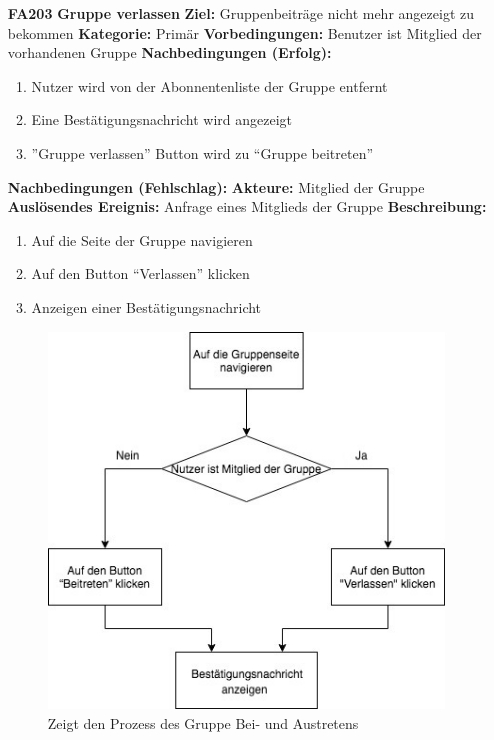 \documentclass[parskip=full]{scrartcl}
\begin{document}
\begin{itemize}[nosep]
			\item[\textbf{FA203}]\textbf{Gruppe verlassen}
			\newline \textbf{Ziel:} Gruppenbeiträge nicht mehr angezeigt zu bekommen
			\newline \textbf{Kategorie:} Primär
			\newline \textbf{Vorbedingungen:} Benutzer ist Mitglied der vorhandenen Gruppe
			\newline \textbf{Nachbedingungen (Erfolg):} 
			\begin{enumerate}[nosep]
				\item Nutzer wird von der \gls{Abonnenten}liste der Gruppe entfernt
				\item Eine Bestätigungsnachricht wird angezeigt
				\item ”Gruppe verlassen” \gls{Button} wird zu “Gruppe beitreten” 
			\end{enumerate}
			\textbf{Nachbedingungen (Fehlschlag):}
			\newline \textbf{Akteure:} Mitglied der Gruppe
			\newline \textbf{Auslösendes Ereignis:} Anfrage eines Mitglieds der Gruppe
			\newline \textbf{Beschreibung:}
			\begin{enumerate}[nosep]
				\item Auf die Seite der Gruppe navigieren
				\item Auf den \gls{Button} “Verlassen” klicken
				\item Anzeigen einer Bestätigungsnachricht\\
			\end{enumerate}
			
					\begin{figure}[H]
						\centering
						\includegraphics[height=10cm]{Gruppendiagramm}
						\caption{Zeigt den Prozess des Gruppe Bei- und Austretens}
						\label{Freundediagramm}
					\end{figure}	
			
		\end{itemize}
		
\end{document}
